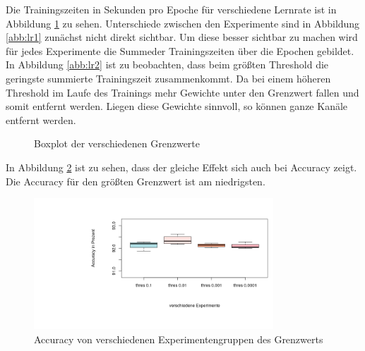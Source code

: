 Die Trainingszeiten in Sekunden pro Epoche für verschiedene Lernrate ist in Abbildung \ref{abb:lr} zu sehen. Unterschiede zwischen den Experimente sind in Abbildung \ref{abb:lr1} zunächst nicht direkt sichtbar. Um diese besser sichtbar zu machen wird für jedes Experimente die Summeder Trainingszeiten über die Epochen gebildet. In Abbildung \ref{abb:lr2} ist zu beobachten, dass beim größten Threshold die geringste summierte Trainingszeit zusammenkommt. Da bei einem höheren Threshold im Laufe des Trainings mehr Gewichte unter den Grenzwert fallen und somit entfernt werden. Liegen diese Gewichte sinnvoll, so können ganze Kanäle entfernt werden.
 \begin{figure}[h]
 \centering
 \qquad
 \caption{Boxplot der verschiedenen Grenzwerte}
 \label{abb:lr}
\end{figure}
 
 In Abbildung \ref{abb:lr3} ist zu sehen, dass der gleiche Effekt sich auch bei Accuracy zeigt. Die Accuracy für den größten Grenzwert ist am niedrigsten.
 
 \begin{figure}[h]
 \centering
 \includegraphics[width=0.8\textwidth]{KapitelPartB/Images/thres3.png}
 \caption{Accuracy von verschiedenen Experimentengruppen des Grenzwerts}
 \label{abb:lr3}
 \end{figure}



